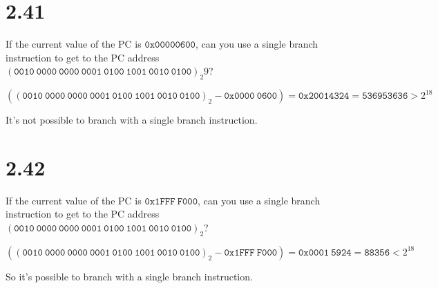 \documentclass[paper=a4, fontsize=11pt]{scrartcl} %
\begin{document}
\section{2.41}

\begin{fancyquotes}

  If the current value of the PC is $\mathtt{0x00000600}$, can you use a single
  branch instruction to get to the PC address $(\mathtt{0010\ 0000\ 0000\ 0001\
  0100\ 1001\ 0010\ 0100})_2$9?

\end{fancyquotes}

$((\mathtt{0010\ 0000\ 0000\ 0001\ 0100\ 1001\ 0010\ 0100})_2
- \mathtt{0x0000\ 0600})
= \mathtt{0x20014324}
= \mathtt{536953636}
> 2^{18}$

It's not possible to branch with a single branch instruction.


\section{2.42}

\begin{fancyquotes}

  If the current value of the PC is $\mathtt{0x1FFF\ F000}$, can you use a
  single branch instruction to get to the PC address $(\mathtt{0010\ 0000\ 0000\
  0001\ 0100\ 1001\ 0010\ 0100})_2$?

\end{fancyquotes}

$((\mathtt{0010\ 0000\ 0000\ 0001\ 0100\ 1001\ 0010\ 0100})_2
- \mathtt{0x1FFF\ F000})
= \mathtt{0x0001\ 5924}
= \mathtt{88356}
< 2^{18}$

So it's possible to branch with a single branch instruction.
\end{document}
